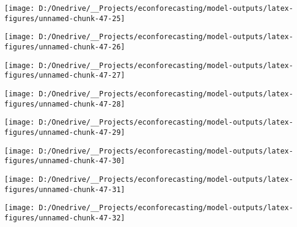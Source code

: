 \documentclass[11pt, letterpaper]{article}\usepackage[]{graphicx}\usepackage[]{color}
\begin{document}
{\centering \texttt{[image: D:/Onedrive/\_\_Projects/econforecasting/model-outputs/latex-figures/unnamed-chunk-47-25]} 

}




{\centering \texttt{[image: D:/Onedrive/\_\_Projects/econforecasting/model-outputs/latex-figures/unnamed-chunk-47-26]} 

}




{\centering \texttt{[image: D:/Onedrive/\_\_Projects/econforecasting/model-outputs/latex-figures/unnamed-chunk-47-27]} 

}




{\centering \texttt{[image: D:/Onedrive/\_\_Projects/econforecasting/model-outputs/latex-figures/unnamed-chunk-47-28]} 

}




{\centering \texttt{[image: D:/Onedrive/\_\_Projects/econforecasting/model-outputs/latex-figures/unnamed-chunk-47-29]} 

}




{\centering \texttt{[image: D:/Onedrive/\_\_Projects/econforecasting/model-outputs/latex-figures/unnamed-chunk-47-30]} 

}




{\centering \texttt{[image: D:/Onedrive/\_\_Projects/econforecasting/model-outputs/latex-figures/unnamed-chunk-47-31]} 

}




{\centering \texttt{[image: D:/Onedrive/\_\_Projects/econforecasting/model-outputs/latex-figures/unnamed-chunk-47-32]} 

}
\end{document}
